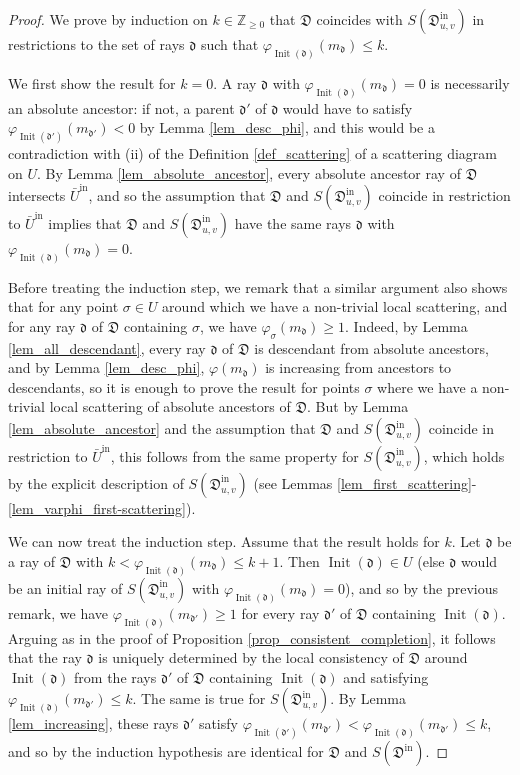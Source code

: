 \documentclass[12pt, a4paper]{amsart}
\newcommand\Z{\mathbb Z}
\newcommand\fd{\mathfrak d}
\newcommand\fD{\mathfrak D}
\newcommand\Init{\operatorname{Init}}
\newcommand\iin{\mathrm{in}}
\begin{document}
\begin{proof}
We prove by induction on $k \in \Z_{\geqslant 0}$ that $\fD$ coincides with 
$S(\fD_{u,v}^\iin)$ in restrictions to the set of rays $\fd$ such that $\varphi_{\Init(\fd)} (m_\fd) \leqslant k$. 

We first show the result for $k=0$. 
A ray $\fd$ with $\varphi_{\Init(\fd)} (m_\fd) =0$ is necessarily an absolute ancestor: if not, a parent $\fd'$ of $\fd$ would have to satisfy $\varphi_{\Init(\fd')}(m_{\fd'})<0$ by Lemma \ref{lem_desc_phi}, and this would be a contradiction with (ii) of the Definition \ref{def_scattering} of a scattering diagram on $U$.
By Lemma \ref{lem_absolute_ancestor}, every absolute ancestor ray of 
$\fD$ intersects $\bar{U}^\iin$, and so the assumption that $\fD$ and $S(\fD_{u,v}^\iin)$ coincide in restriction to
$\bar{U}^\iin$  implies that $\fD$ and $S(\fD_{u,v}^\iin)$ have the same rays $\fd$ with $\varphi_{\Init(\fd)} (m_\fd) =0$.

Before treating the induction step, we remark that a similar argument also shows that for any point $\sigma \in U$ around which we have a non-trivial local scattering, and for any ray $\fd$ of $\fD$ containing $\sigma$, we have $\varphi_{\sigma}(m_\fd) \geqslant 1$. Indeed, by Lemma \ref{lem_all_descendant}, every ray $\fd$ of $\fD$ is descendant from absolute ancestors, and by Lemma \ref{lem_desc_phi}, $\varphi(m_\fd)$ is increasing from ancestors to descendants, so it is enough to prove the result for points $\sigma$ where we have a non-trivial local scattering of absolute ancestors of $\fD$.
But by Lemma \ref{lem_absolute_ancestor} and the assumption that $\fD$ and $S(\fD_{u,v}^\iin)$ coincide in restriction to $\bar{U}^\iin$, this follows from the same property for $S(\fD_{u,v}^\iin)$, which holds by the explicit description of 
$S(\fD_{u,v}^\iin)$ (see Lemmas \ref{lem_first_scattering}-\ref{lem_varphi_first-scattering}).


We can now treat the induction step. Assume that the result holds for $k$. Let $\fd$ be a ray of $\fD$ with $k<\varphi_{\Init(\fd)}(m_\fd)\leqslant k+1$. Then $\Init(\fd) \in U$ (else $\fd$ would be an initial ray of $S(\fD_{u,v}^\iin)$ with
$\varphi_{\Init(\fd)}(m_\fd)=0$), and so by the previous remark, we have $\varphi_{\Init(\fd)}(m_{\fd'}) \geqslant 1$ for every ray $\fd'$ of $\fD$ containing $\Init(\fd)$. Arguing as in the proof of Proposition \ref{prop_consistent_completion}, it follows that the ray $\fd$ is uniquely determined by the local consistency of $\fD$ around $\Init(\fd)$ from the rays 
$\fd'$ of $\fD$ containing $\Init(\fd)$ and satisfying $\varphi_{\Init(\fd)}(m_{\fd'}) \leqslant k$. The same is true for $S(\fD_{u,v}^\iin)$. By Lemma \ref{lem_increasing}, these rays $\fd'$ satisfy $\varphi_{\Init(\fd')}(m_{\fd'})<
\varphi_{\Init(\fd)}(m_{\fd'})\leqslant k$, and so by the induction hypothesis are identical for $\fD$ and $S(\fD^\iin)$.
\end{proof}
\end{document}
